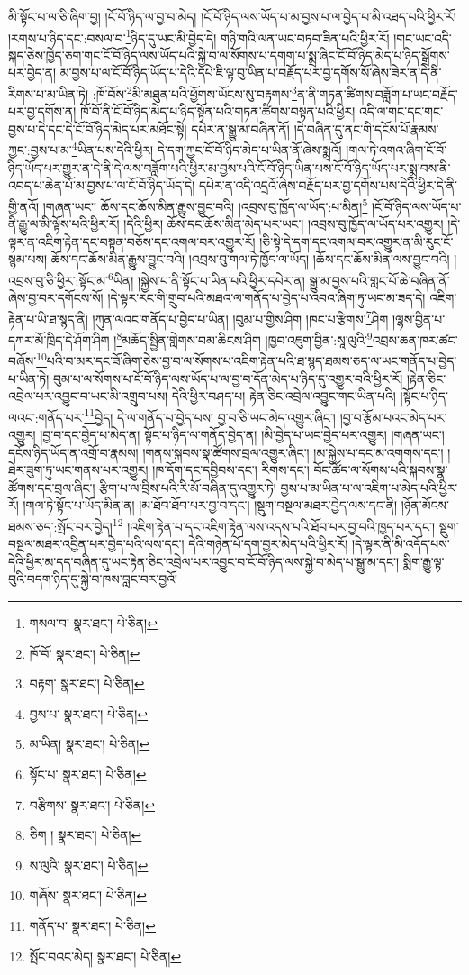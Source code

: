 མི་སྟོང་པ་ལ་ཅི་ཞིག་བྱ། །ངོ་བོ་ཉིད་ལ་བྱ་བ་མེད། །ངོ་བོ་ཉིད་ལས་ཡོད་པ་མ་བྱས་པ་ལ་བྱེད་པ་མི་འཐད་པའི་ཕྱིར་རོ། །རགས་པ་ཉིད་དང་:བསལ་བ་\footnote{གསལ་བ་  སྣར་ཐང་།  པེ་ཅིན། }ཉིད་དུ་ཡང་མི་བྱེད་དེ། གཉི་གའི་ལན་ཡང་བཏབ་ཟིན་པའི་ཕྱིར་རོ། །གང་ཡང་འདི་སྐད་ཅེས་ཁྱེད་ཅག་གང་ངོ་བོ་ཉིད་ལས་ཡོད་པའི་སྐྱེ་བ་ལ་སོགས་པ་དགག་པ་སྨྲ་ཞིང་ངོ་བོ་ཉིད་མེད་པ་ཉིད་སྒྲོགས་པར་བྱེད་ན། མ་བྱས་པ་ལ་ངོ་བོ་ཉིད་ཡོད་པ་དེའི་དཔེ་ཇི་ལྟ་བུ་ཡིན་པ་བརྗོད་པར་བྱ་དགོས་སོ་ཞེས་ཟེར་ན་དེ་ནི་རིགས་པ་མ་ཡིན་ཏེ། :ཁོ་བོས་\footnote{ཁོ་བོ་  སྣར་ཐང་།  པེ་ཅིན། }མི་མཐུན་པའི་ཕྱོགས་ཡོངས་སུ་བརྟགས་\footnote{བརྟག་  སྣར་ཐང་།  པེ་ཅིན། }ན་ནི་གཏན་ཚིགས་བཟློག་པ་ཡང་བརྗོད་པར་བྱ་དགོས་ན། ཁོ་བོ་ནི་ངོ་བོ་ཉིད་མེད་པ་ཉིད་སྟོན་པའི་གཏན་ཚིགས་བསྟན་པའི་ཕྱིར། འདི་ལ་གང་དང་གང་བྱས་པ་དེ་དང་དེ་ངོ་བོ་ཉིད་མེད་པར་མཐོང་སྟེ། དཔེར་ན་སྒྱུ་མ་བཞིན་ནོ། །དེ་བཞིན་དུ་ནང་གི་དངོས་པོ་རྣམས་ཀྱང་:བྱས་པ་མ་\footnote{བྱས་པ་  སྣར་ཐང་།  པེ་ཅིན། }ཡིན་པས་དེའི་ཕྱིར། དེ་དག་ཀྱང་ངོ་བོ་ཉིད་མེད་པ་ཡིན་ནོ་ཞེས་སྨྲའོ། །གལ་ཏེ་འགའ་ཞིག་ངོ་བོ་ཉིད་ཡོད་པར་གྱུར་ན་དེ་ནི་དེ་ལས་བཟློག་པའི་ཕྱིར་མ་བྱས་པའི་ངོ་བོ་ཉིད་ཡིན་པས་ངོ་བོ་ཉིད་ཡོད་པར་སྨྲ་བས་ནི་འབད་པ་ཆེན་པོ་མ་བྱས་པ་ལ་ངོ་བོ་ཉིད་ཡོད་དེ། དཔེར་ན་འདི་འདྲའོ་ཞེས་བརྗོད་པར་བྱ་དགོས་པས་དེའི་ཕྱིར་དེ་ནི་གྱི་ནའོ། །གཞན་ཡང་། ཆོས་དང་ཆོས་མིན་རྒྱུས་བྱུང་བའི། །འབྲས་བུ་ཁྱོད་ལ་ཡོད་:པ་མིན།\footnote{མ་ཡིན།  སྣར་ཐང་།  པེ་ཅིན། } །ངོ་བོ་ཉིད་ལས་ཡོད་པ་ནི་རྒྱུ་ལ་མི་ལྟོས་པའི་ཕྱིར་རོ། །དེའི་ཕྱིར། ཆོས་དང་ཆོས་མིན་མེད་པར་ཡང་། །འབྲས་བུ་ཁྱོད་ལ་ཡོད་པར་འགྱུར། །དེ་ལྟར་ན་འཇིག་རྟེན་དང་བསྟན་བཅོས་དང་འགལ་བར་འགྱུར་རོ། །ཅི་སྟེ་དེ་དག་དང་འགལ་བར་འགྱུར་ན་མི་རུང་ངོ་སྙམ་པས། ཆོས་དང་ཆོས་མིན་རྒྱུས་བྱུང་བའི། །འབྲས་བུ་གལ་ཏེ་ཁྱོད་ལ་ཡོད། །ཆོས་དང་ཆོས་མིན་ལས་བྱུང་བའི། །འབྲས་བུ་ཅི་ཕྱིར་:སྟོང་མ་\footnote{སྟོང་པ་  སྣར་ཐང་།  པེ་ཅིན། }ཡིན། །སྐྱེས་པ་ནི་སྟོང་པ་ཡིན་པའི་ཕྱིར་དཔེར་ན། སྒྱུ་མ་བྱས་པའི་གླང་པོ་ཆེ་བཞིན་ནོ་ཞེས་བྱ་བར་དགོངས་སོ། །དེ་ལྟར་རང་གི་གྲུབ་པའི་མཐའ་ལ་གནོད་པ་བྱེད་པ་འབའ་ཞིག་ཏུ་ཡང་མ་ཟད་དེ། འཇིག་རྟེན་པ་ཡི་ཐ་སྙད་ནི། །ཀུན་ལའང་གནོད་པ་བྱེད་པ་ཡིན། །བུམ་པ་གྱིས་ཤིག །ཁང་པ་རྩིགས་\footnote{བརྩིགས་  སྣར་ཐང་།  པེ་ཅིན། }ཤིག །ལྷས་བྱིན་པ་དཀར་མོ་ཁྲིད་དེ་ཤོག་ཤིག །\footnote{ཅིག །  སྣར་ཐང་།  པེ་ཅིན། }མཆོད་སྦྱིན་གླེགས་བམ་ཆིངས་ཤིག །ཁྱབ་འཇུག་བྱིན་:སཱ་ལུའི་\footnote{ས་ལུའི་  སྣར་ཐང་།  པེ་ཅིན། }འབྲས་ཆན་ཁར་ཚང་བཞོས་\footnote{གཞོས་  སྣར་ཐང་།  པེ་ཅིན། }པའི་བ་མར་དང་ཟོ་ཞིག་ཅེས་བྱ་བ་ལ་སོགས་པ་འཇིག་རྟེན་པའི་ཐ་སྙད་ཐམས་ཅད་ལ་ཡང་གནོད་པ་བྱེད་པ་ཡིན་ཏེ། བུམ་པ་ལ་སོགས་པ་ངོ་བོ་ཉིད་ལས་ཡོད་པ་ལ་བྱ་བ་དོན་མེད་པ་ཉིད་དུ་འགྱུར་བའི་ཕྱིར་རོ། །རྟེན་ཅིང་འབྲེལ་པར་འབྱུང་བ་ཡང་མི་འགྲུབ་པས། དེའི་ཕྱིར་བཤད་པ། རྟེན་ཅིང་འབྲེལ་འབྱུང་གང་ཡིན་པའི། །སྟོང་པ་ཉིད་ལའང་:གནོད་པར་\footnote{གནོད་པ་  སྣར་ཐང་།  པེ་ཅིན། }བྱེད། དེ་ལ་གནོད་པ་བྱེད་པས། བྱ་བ་ཅི་ཡང་མེད་འགྱུར་ཞིང་། །བྱ་བ་རྩོམ་པའང་མེད་པར་འགྱུར། །བྱ་བ་དང་བྱེད་པ་མེད་ན། སྟོང་པ་ཉིད་ལ་གནོད་བྱེད་ན། །མི་བྱེད་པ་ཡང་བྱེད་པར་འགྱུར། །གཞན་ཡང་། དངོས་ཉིད་ཡོད་ན་འགྲོ་བ་རྣམས། །གནས་སྐབས་སྣ་ཚོགས་བྲལ་འགྱུར་ཞིང་། །མ་སྐྱེས་པ་དང་མ་འགགས་དང་། །ཐེར་ཟུག་ཏུ་ཡང་གནས་པར་འགྱུར། །ཁ་དོག་དང་དབྱིབས་དང་། རིགས་དང་། བོང་ཚོད་ལ་སོགས་པའི་སྐབས་སྣ་ཚོགས་དང་བྲལ་ཞིང་། རྩིག་པ་ལ་བྲིས་པའི་རི་མོ་བཞིན་དུ་འགྱུར་ཏེ། བྱས་པ་མ་ཡིན་པ་ལ་འཇིག་པ་མེད་པའི་ཕྱིར་རོ། །གལ་ཏེ་སྟོང་པ་ཡོད་མིན་ན། །མ་ཐོབ་ཐོབ་པར་བྱ་བ་དང་། །སྡུག་བསྔལ་མཐར་བྱེད་ལས་དང་ནི། །ཉོན་མོངས་ཐམས་ཅད་:སྤོང་བར་བྱེད།\footnote{སྤོང་བའང་མེད།  སྣར་ཐང་།  པེ་ཅིན། } །འཇིག་རྟེན་པ་དང་འཇིག་རྟེན་ལས་འདས་པའི་ཐོབ་པར་བྱ་བའི་ཁྱད་པར་དང་། སྡུག་བསྔལ་མཐར་འབྱིན་པར་བྱེད་པའི་ལས་དང་། དེའི་གཉེན་པོ་དག་བྱར་མེད་པའི་ཕྱིར་རོ། །དེ་ལྟར་ནི་མི་འདོད་པས་དེའི་ཕྱིར་མ་དད་བཞིན་དུ་ཡང་རྟེན་ཅིང་འབྲེལ་པར་འབྱུང་བ་ངོ་བོ་ཉིད་ལས་སྐྱེ་བ་མེད་པ་སྒྱུ་མ་དང་། སྨིག་རྒྱུ་ལྟ་བུའི་བདག་ཉིད་དུ་སྐྱེ་བ་ཁས་བླང་བར་བྱའོ། 